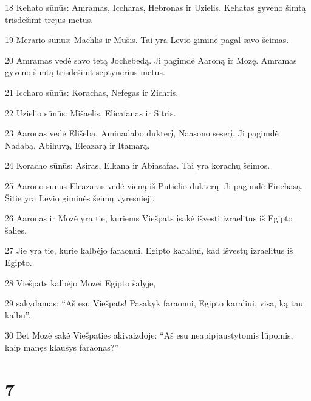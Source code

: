 \par 18 Kehato sūnūs: Amramas, Iccharas, Hebronas ir Uzielis. Kehatas gyveno šimtą trisdešimt trejus metus. 
\par 19 Merario sūnūs: Machlis ir Mušis. Tai yra Levio giminė pagal savo šeimas. 
\par 20 Amramas vedė savo tetą Jochebedą. Ji pagimdė Aaroną ir Mozę. Amramas gyveno šimtą trisdešimt septynerius metus. 
\par 21 Iccharo sūnūs: Korachas, Nefegas ir Zichris. 
\par 22 Uzielio sūnūs: Mišaelis, Elicafanas ir Sitris. 
\par 23 Aaronas vedė Elišebą, Aminadabo dukterį, Naasono seserį. Ji pagimdė Nadabą, Abihuvą, Eleazarą ir Itamarą. 
\par 24 Koracho sūnūs: Asiras, Elkana ir Abiasafas. Tai yra korachų šeimos. 
\par 25 Aarono sūnus Eleazaras vedė vieną iš Putielio dukterų. Ji pagimdė Finehasą. Šitie yra Levio giminės šeimų vyresnieji. 
\par 26 Aaronas ir Mozė yra tie, kuriems Viešpats įsakė išvesti izraelitus iš Egipto šalies. 
\par 27 Jie yra tie, kurie kalbėjo faraonui, Egipto karaliui, kad išvestų izraelitus iš Egipto. 
\par 28 Viešpats kalbėjo Mozei Egipto šalyje, 
\par 29 sakydamas: “Aš esu Viešpats! Pasakyk faraonui, Egipto karaliui, visa, ką tau kalbu”. 
\par 30 Bet Mozė sakė Viešpaties akivaizdoje: “Aš esu neapipjaustytomis lūpomis, kaip manęs klausys faraonas?”



\chapter{7}



